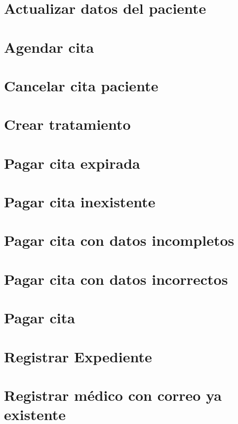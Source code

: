 
\section{Actualizar datos del paciente}

\section{Agendar cita}

\section{Cancelar cita paciente}

\section{ Crear tratamiento}

\section{Pagar cita expirada}


\section{Pagar cita inexistente}

\section{Pagar cita con datos incompletos}

\section{Pagar cita con datos incorrectos}

\section{ Pagar cita}

\section{ Registrar Expediente}

\section{ Registrar médico con correo ya existente}

